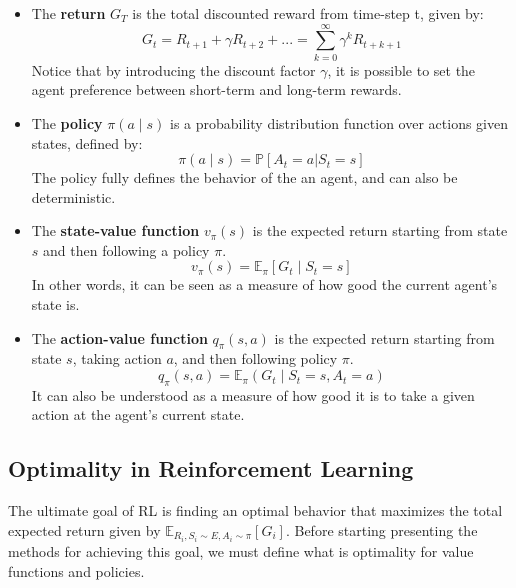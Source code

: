 \begin{itemize}
\item
	The \textbf{return} $G_T$ is the total discounted reward from time-step t, given by:
	\begin{equation}
	G_t = R_{t+1} + \gamma R_{t+2} + ... = \sum_{k=0}^{\infty}{\gamma^k R_{t+k+1}}
	\end{equation}
	Notice that by introducing the discount factor $\gamma$, it is possible to set the agent preference between short-term and long-term rewards.
\item
	The \textbf{policy} $\pi(a \mid s)$ is a probability distribution function over actions given states, defined by:
	\begin{equation}
	\pi(a \mid s) = \mathbb{P}[A_t=a | S_t=s]
	\end{equation}
	The policy fully defines the behavior of the an agent, and can also be deterministic.
\item
	The \textbf{state-value function} $v_{\pi}(s)$ is the expected return starting from state $s$ and then following a policy $\pi$.
	\begin{equation}
	v_{\pi}(s) = \mathbb{E}_{\pi}[G_t \mid S_t = s]
	\label{eq:state_value_function_definition}
	\end{equation}
	In other words, it can be seen as a measure of how good the current agent's state is.
\item
	The \textbf{action-value function} $q_{\pi}(s,a)$ is the expected return starting from state $s$, taking action $a$, and then following policy $\pi$.
	\begin{equation}
	q_{\pi}(s,a) = \mathbb{E}_{\pi}(G_t \mid S_t = s, A_t = a)
	\label{eq:action_value_function_definition}
	\end{equation}
	It can also be understood as a measure of how good it is to take a given action at the agent's current state.
\end{itemize}

\subsection{Optimality in Reinforcement Learning}

The ultimate goal of RL is finding an optimal behavior that maximizes the total expected return given by $\mathbb{E}_{R_i,S_i \sim E, A_i \sim \pi}[G_i]$. Before starting presenting the methods for achieving this goal, we must define what is optimality for value functions and policies.

